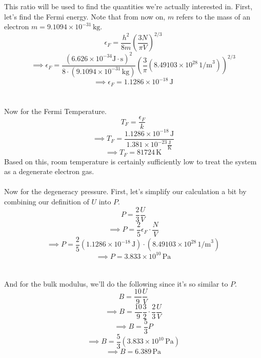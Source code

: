 \documentclass[12pt]{article}
\newcommand{\boltzmannConstK}{1.381\times10^{-23}\frac{\text{J}}{\text{K}}}
\newcommand{\planckConst}{6.626\times10^{-34}\text{J}\cdot\text{s}}
\begin{document}
\begin{flushleft}
This ratio will be used to find the quantities we're actually interested in.
First, let's find the Fermi energy.
Note that from now on, $m$ refers to the mass of an electron $m=9.1094\times10^{-31}\,\text{kg}$.
$$\epsilon_F=\frac{h^2}{8m}\left(\frac{3N}{\pi V}\right)^{2/3}$$
$$\implies\epsilon_F=\frac{(\planckConst)^2}{8\cdot(9.1094\times10^{-31}\,\text{kg})}\left(\frac{3}{\pi}(8.49103\times10^{28}\,\text{1/m}^3)\right)^{2/3}$$
$$\implies\epsilon_F=1.1286\times10^{-18}\,\text{J}$$\\~\\

Now for the Fermi Temperature.
$$T_F=\frac{\epsilon_F}{k}$$
$$\implies T_F=\frac{1.1286\times10^{-18}\,\text{J}}{\boltzmannConstK}$$
$$\implies T_F=81724\,\text{K}$$
Based on this, room temperature is certainly sufficiently low to treat the system as a degenerate electron gas.\\~\\

Now for the degeneracy pressure.
First, let's simplify our calculation a bit by combining our definition of $U$ into $P$.
$$P=\frac{2}{3}\frac{U}{V}$$
$$\implies P=\frac{2}{5}\epsilon_F\cdot\frac{N}{V}$$
$$\implies P=\frac{2}{5}(1.1286\times10^{-18}\,\text{J})\cdot(8.49103\times10^{28}\,\text{1/m}^3)$$
$$\implies P=3.833\times10^{10}\,\text{Pa}$$\\~\\

And for the bulk modulus, we'll do the following since it's so similar to $P$.
$$B=\frac{10}{9}\frac{U}{V}$$
$$\implies B=\frac{10}{9}\frac{3}{2}\cdot\frac{2}{3}\frac{U}{V}$$
$$\implies B=\frac{5}{3}P$$
$$\implies B=\frac{5}{3}(3.833\times10^{10}\,\text{Pa})$$
$$\implies B=6.389\,\text{Pa}$$






\end{flushleft}
\end{document}
